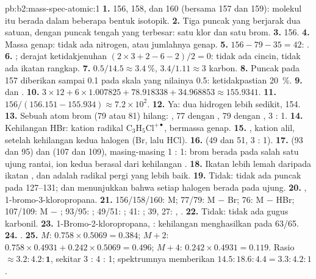\begin{solution}{pb:b2:mass-spec-atomic:1}
\textbf{1.} 156, 158, dan 160 (bersama 157 dan 159): molekul itu berada
dalam beberapa bentuk isotopik.
\textbf{2.} Tiga puncak yang berjarak dua satuan, dengan puncak tengah yang
terbesar: satu klor dan satu brom.
\textbf{3.} 156.
\textbf{4.} Massa genap: tidak ada nitrogen, atau jumlahnya genap.
\textbf{5.} $156 - 79 - 35 = 42$: .
\textbf{6.} ; derajat ketidakjenuhan $(2 \times 3 + 2 - 6 - 2)/2 = 0$:
tidak ada cincin, tidak ada ikatan rangkap.
\textbf{7.} $0.5/14.5 \approx 3.4~\%$, $3.4/1.11 \approx 3$ karbon.
\textbf{8.} Puncak pada 157 diberikan sampai 0.1 pada skala yang nilainya
0.5: ketidakpastian 20~\%.
\textbf{9.}  dan .
\textbf{10.} $3 \times 12 + 6 \times 1.007825 + 78.918338 + 34.968853 \approx 155.9341$.
\textbf{11.} $156/(156.151 - 155.934) \approx 7.2 \times 10^2$.
\textbf{12.} Ya: dua hidrogen lebih sedikit, 154.
\textbf{13.} Sebuah atom brom (79 atau 81) hilang: , 77 dengan
, 79 dengan ,
3 : 1.
\textbf{14.} Kehilangan HBr: kation radikal $\mathrm{C_3H_5Cl^{+\bullet}}$, bermassa genap.
\textbf{15.} , kation alil, setelah kehilangan kedua halogen (Br, lalu HCl).
\textbf{16.}  (49 dan 51, 3 : 1).
\textbf{17.}  (93 dan 95) dan  (107 dan 109),
masing-masing 1 : 1: brom berada pada salah satu ujung rantai, ion kedua
berasal dari kehilangan .
\textbf{18.} Ikatan  lebih lemah daripada ikatan , dan
 adalah radikal pergi yang lebih baik.
\textbf{19.} Tidak: tidak ada puncak pada 127--131;  dan
 menunjukkan bahwa setiap halogen berada pada  ujung.
\textbf{20.} , 1-bromo-3-kloropropana.
\textbf{21.} 156/158/160: M; 77/79: M $-$ Br; 76: M $-$ HBr; 107/109: M $-$ ;
93/95: ; 49/51: ; 41: ; 39, 27: , .
\textbf{22.} Tidak: tidak ada gugus karbonil.
\textbf{23.} 1-Bromo-2-kloropropana, : kehilangan 
menghasilkan  pada 63/65.
\textbf{24.} .
\textbf{25.} $M$: $0.758 \times 0.5069 = 0.384$; $M+2$: $0.758 \times 0.4931 + 0.242 \times 0.5069 =
0.496$; $M+4$: $0.242 \times 0.4931 = 0.119$. Rasio $\boldsymbol{\approx 3.2 : 4.2 : 1}$,
sekitar 3 : 4 : 1; spektrumnya memberikan $14.5 : 18.6 : 4.4 = 3.3 : 4.2 : 1$.
\end{solution}

